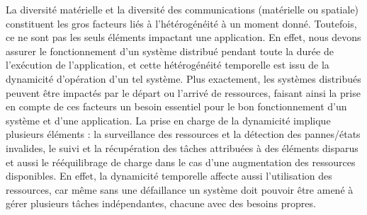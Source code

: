 La diversité matérielle et la diversité des communications (matérielle ou spatiale) constituent les gros facteurs liés à l'hétérogénéité à un moment donné. Toutefois, ce ne sont pas les seuls éléments impactant une application. En effet, nous devons assurer le fonctionnement d'un système distribué pendant toute la durée de l'exécution de l'application, et cette hétérogénéité temporelle est issu de la dynamicité d'opération d'un tel système. Plus exactement, les systèmes distribués peuvent être impactés par le départ ou l'arrivé de ressources, faisant ainsi la prise en compte de ces facteurs un besoin essentiel pour le bon fonctionnement d'un système et d'une application. La prise en charge de la dynamicité implique plusieurs éléments : la surveillance des ressources et la détection des pannes/états invalides, le suivi et la récupération des tâches attribuées à des éléments disparus et aussi le rééquilibrage de charge dans le cas d'une augmentation des ressources disponibles. En effet, la dynamicité temporelle affecte aussi l'utilisation des ressources, car même sans une défaillance un système doit pouvoir être amené à gérer plusieurs tâches indépendantes, chacune avec des besoins propres.


